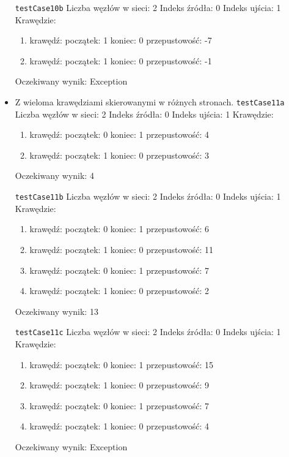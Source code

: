 \begin{itemize}[nosep]
    \texttt{testCase10b}
    Liczba węzłów w sieci: 2
    Indeks źródła: 0
    Indeks ujścia: 1
    Krawędzie:
    \begin{enumerate}[nosep]
        \item krawędź:
        początek: 1
        koniec: 0
        przepustowość: -7
        \item krawędź:
        początek: 1
        koniec: 0
        przepustowość: -1
    \end{enumerate}
    Oczekiwany wynik: Exception

    \item Z wieloma krawędziami skierowanymi w różnych stronach.
    \texttt{testCase11a}
    Liczba węzłów w sieci: 2
    Indeks źródła: 0
    Indeks ujścia: 1
    Krawędzie:
    \begin{enumerate}[nosep]
        \item krawędź:
        początek: 0
        koniec: 1
        przepustowość: 4
        \item krawędź:
        początek: 1
        koniec: 0
        przepustowość: 3
    \end{enumerate}
    Oczekiwany wynik: 4

    \texttt{testCase11b}
    Liczba węzłów w sieci: 2
    Indeks źródła: 0
    Indeks ujścia: 1
    Krawędzie:
    \begin{enumerate}[nosep]
        \item krawędź:
        początek: 0
        koniec: 1
        przepustowość: 6
        \item krawędź:
        początek: 1
        koniec: 0
        przepustowość: 11
        \item krawędź:
        początek: 0
        koniec: 1
        przepustowość: 7
        \item krawędź:
        początek: 1
        koniec: 0
        przepustowość: 2
    \end{enumerate}
    Oczekiwany wynik: 13

    \texttt{testCase11c}
    Liczba węzłów w sieci: 2
    Indeks źródła: 0
    Indeks ujścia: 1
    Krawędzie:
    \begin{enumerate}[nosep]
        \item krawędź:
        początek: 0
        koniec: 1
        przepustowość: 15
        \item krawędź:
        początek: 1
        koniec: 0
        przepustowość: 9
        \item krawędź:
        początek: 0
        koniec: 1
        przepustowość: 7
        \item krawędź:
        początek: 1
        koniec: 0
        przepustowość: 4
    \end{enumerate}
    Oczekiwany wynik: Exception

\end{itemize}



